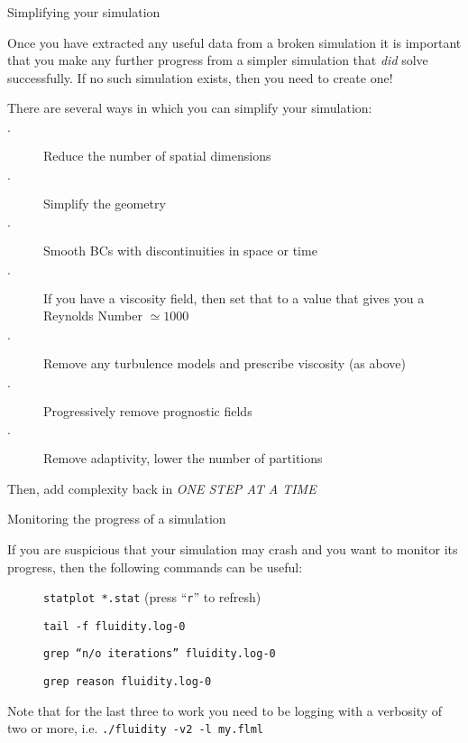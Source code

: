 \documentclass[professionalfonts, 8pt]{beamer}
\begin{document}
\begin{frame}{Simplifying your simulation}

Once you have extracted any useful data from a broken simulation
it is important that you make any further progress from a simpler simulation that {\it did} solve successfully.
If no such simulation exists, then you need to create one!

\vspace{1ex}
There are several ways in which you can simplify your simulation:

\begin{description}
 \item[$\cdot$] Reduce the number of spatial dimensions
 \item[$\cdot$] Simplify the geometry 
 \item[$\cdot$] Smooth BCs with discontinuities in space or time
 \item[$\cdot$] If you have a viscosity field, then set that to a value that gives you a Reynolds Number $\simeq 1000$
 \item[$\cdot$] Remove any turbulence models and prescribe viscosity (as above)
 \item[$\cdot$] Progressively remove prognostic fields
 \item[$\cdot$] Remove adaptivity, lower the number of partitions
\end{description}

Then, add complexity back in \emph{\color{red}ONE STEP AT A TIME}

\end{frame}


\begin{frame}{Monitoring the progress of a simulation}

If you are suspicious that your simulation may crash and you want to monitor its progress,
then the following commands can be useful:

\vspace{1ex}
\begin{description}
 \item[] {\tt statplot *.stat} (press ``{\tt r}'' to refresh)
 \item[] {\tt tail -f fluidity.log-0}
 \item[] {\tt grep ``n/o iterations'' fluidity.log-0}
 \item[] {\tt grep reason fluidity.log-0}
\end{description}

Note that for the last three to work you need to be logging with a verbosity of two or more, 
i.e. {\tt ./fluidity -v2 -l my.flml}

\end{frame}
\end{document}
